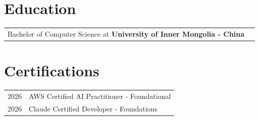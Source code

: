 \documentclass[a4paper,12pt]{article}
\begin{document}
\section{Education}
\begin{tabularx}{\linewidth}{@{}l X@{}}	
Bachelor of Computer Science at \textbf{University of Inner Mongolia - China} 
\end{tabularx}

\section{Certifications}
\begin{tabularx}{\linewidth}{@{}l X@{}}
2026 & AWS Certified AI Practitioner - Foundational \\
2026 & Claude Certified Developer - Foundations
\end{tabularx}


\vfill
\end{document}
